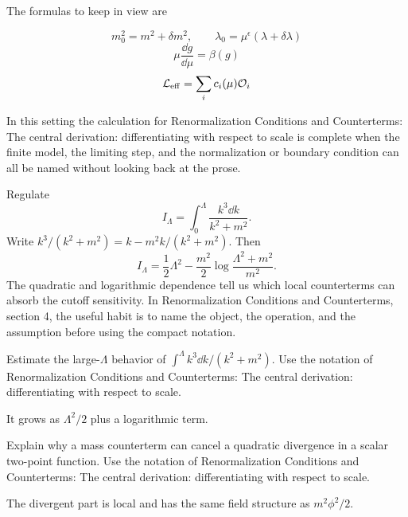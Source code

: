 The formulas to keep in view are

\[
  m_0^2=m^2+\delta m^2,\qquad \lambda_0=\mu^\epsilon(\lambda+\delta\lambda)
\]
\[
  \mu\frac{\dd g}{\dd\mu}=\beta(g)
\]
\[
  \mathcal L_{\mathrm{eff}}=\sum_i c_i(\mu)\mathcal O_i
\]

In this setting the calculation for Renormalization Conditions and Counterterms: The central derivation: differentiating with respect to scale is complete when the finite model, the limiting step, and the normalization or boundary condition can all be named without looking back at the prose.




\begin{example}
Regulate
\[
  I_\Lambda=\int_0^\Lambda\frac{k^3\dd k}{k^2+m^2}.
\]
Write \(k^3/(k^2+m^2)=k-m^2k/(k^2+m^2)\).  Then
\[
  I_\Lambda=\frac12\Lambda^2-\frac{m^2}{2}\log\frac{\Lambda^2+m^2}{m^2}.
\]
The quadratic and logarithmic dependence tell us which local counterterms can absorb the cutoff sensitivity.  In Renormalization Conditions and Counterterms, section 4, the useful habit is to name the object, the operation, and the assumption before using the compact notation.
\end{example}



\begin{exercise}
Estimate the large-\(\Lambda\) behavior of \(\int^\Lambda k^3\dd k/(k^2+m^2)\).  Use the notation of Renormalization Conditions and Counterterms: The central derivation: differentiating with respect to scale.
\begin{answer}
It grows as \(\Lambda^2/2\) plus a logarithmic term.
\end{answer}
\end{exercise}

\begin{exercise}
Explain why a mass counterterm can cancel a quadratic divergence in a scalar two-point function.  Use the notation of Renormalization Conditions and Counterterms: The central derivation: differentiating with respect to scale.
\begin{answer}
The divergent part is local and has the same field structure as \(m^2\phi^2/2\).
\end{answer}
\end{exercise}



